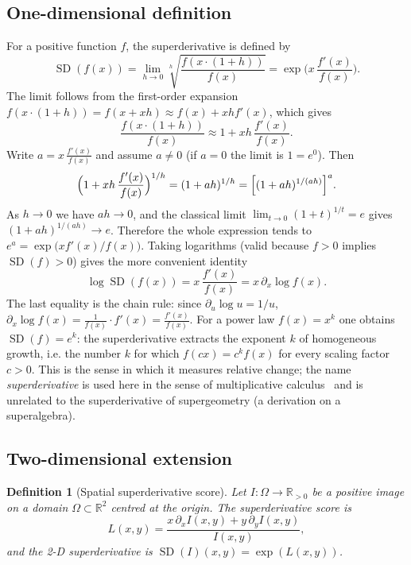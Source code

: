 \documentclass[conference]{IEEEtran}
\newtheorem{definition}{Definition}
\newcommand{\R}{\mathbb{R}}
\DeclareMathOperator{\SD}{SD}
\begin{document}
\subsection{One-dimensional definition}
For a positive function $f$, the superderivative is defined by~\cite{zotkin,grossman}
\begin{equation}
\SD(f(x))=\lim_{h\to0}\sqrt[h]{\frac{f(x\cdot(1+h))}{f(x)}}
=\exp\!\Big(x\,\frac{f'(x)}{f(x)}\Big).
\label{eq:sd}
\end{equation}
The limit follows from the first-order expansion
$f(x\cdot(1+h))=f(x+xh)\approx f(x)+xh f'(x)$, which gives
\begin{equation}
\frac{f(x\cdot(1+h))}{f(x)}\approx 1+xh\,\frac{f'(x)}{f(x)}.
\end{equation}
Write $a=x\,\frac{f'(x)}{f(x)}$ and assume $a\neq0$ (if $a=0$ the limit is
$1=e^0$).  Then
\begin{equation}
\Bigl(1+xh\,\frac{f'(x)}{f(x)}\Bigr)^{1/h}
=(1+ah)^{1/h}
=\Bigl[(1+ah)^{1/(ah)}\Bigr]^{a}.
\end{equation}
As $h\to0$ we have $ah\to0$, and the classical limit
$\lim_{t\to0}(1+t)^{1/t}=e$ gives $(1+ah)^{1/(ah)}\to e$.  Therefore the
whole expression tends to $e^{a}=\exp\!\bigl(xf'(x)/f(x)\bigr)$.
Taking logarithms (valid because $f>0$ implies $\SD(f)>0$) gives the more
convenient identity
\begin{equation}
\log\SD(f(x))=x\,\frac{f'(x)}{f(x)}=x\,\partial_x\log f(x).
\label{eq:logsd}
\end{equation}
The last equality is the chain rule: since $\partial_u\log u=1/u$,
$\partial_x\log f(x)=\frac{1}{f(x)}\cdot f'(x)=\frac{f'(x)}{f(x)}$.
For a power law $f(x)=x^k$ one obtains $\SD(f)=e^k$: the superderivative
extracts the exponent $k$ of homogeneous growth, i.e. the number $k$ for which
$f(cx)=c^k f(x)$ for every scaling factor $c>0$.  This is the sense in which
it measures relative change; the name \emph{superderivative} is used here in the
sense of multiplicative calculus~\cite{zotkin} and is unrelated to the
superderivative of supergeometry (a derivation on a superalgebra).

\subsection{Two-dimensional extension}
\begin{definition}[Spatial superderivative score]
Let $I:\Omega\to\R_{>0}$ be a positive image on a domain
$\Omega\subset\R^2$ centred at the origin.  The \emph{superderivative score}
is
\begin{equation}
L(x,y)=\frac{x\,\partial_x I(x,y)+y\,\partial_y I(x,y)}{I(x,y)},
\label{eq:L2}
\end{equation}
and the 2-D superderivative is $\SD(I)(x,y)=\exp(L(x,y))$.
\end{definition}
\end{document}
